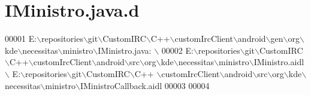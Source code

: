 \hypertarget{_i_ministro_8java_8d}{\section{I\-Ministro.\-java.\-d}
\label{d5/d80/_i_ministro_8java_8d}
}

\begin{DoxyCode}
00001 E:\(\backslash\)repositories\(\backslash\)git\(\backslash\)CustomIRC\(\backslash\)C++\(\backslash\)customIrcClient\(\backslash\)android\(\backslash\)gen\(\backslash\)org\(\backslash\)kde\(\backslash\)necessitas\(\backslash\)ministro\(\backslash\)IMinistro.java: \(\backslash\)
00002   E:\(\backslash\)repositories\(\backslash\)git\(\backslash\)CustomIRC\(\backslash\)C++\(\backslash\)customIrcClient\(\backslash\)android\(\backslash\)src\(\backslash\)org\(\backslash\)kde\(\backslash\)necessitas\(\backslash\)ministro\(\backslash\)IMinistro.aidl
       \(\backslash\)
  E:\(\backslash\)repositories\(\backslash\)git\(\backslash\)CustomIRC\(\backslash\)C++
      \(\backslash\)customIrcClient\(\backslash\)android\(\backslash\)src\(\backslash\)org\(\backslash\)kde\(\backslash\)necessitas\(\backslash\)ministro\(\backslash\)IMinistroCallback.aidl 
00003 
00004 \end{DoxyCode}
